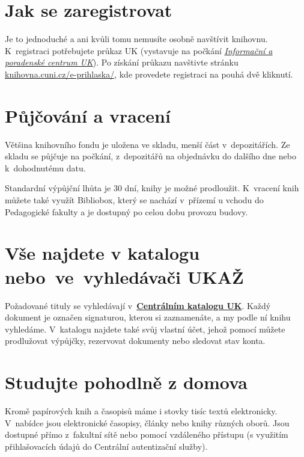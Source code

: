 

\newcommand\ikonka[1]{\bigskip\bgroup\Large #1\egroup\par}
\ikonka{\faPencil}
\section{Jak se zaregistrovat }

Je to jednoduché a ani kvůli tomu nemusíte osobně navštívit knihovnu.
K~registraci  potřebujete
  průkaz UK (vystavuje na počkání
  \href{http://www.cuni.cz/UK-3249.html}{\emph{Informační a poradenské
  centrum UK}}). Po získání průkazu navštivte stránku \url{knihovna.cuni.cz/e-prihlaska/},
  kde provedete registraci na pouhá dvě kliknutí.

\ikonka{\faBook}
\section{Půjčování a vracení}

Většina knihovního fondu je uložena ve skladu, menší část
v~depozitářích. Ze skladu se půjčuje na počkání, z~depozitářů na
objednávku do dalšího dne nebo k~dohodnutému datu.


Standardní výpůjční lhůta je 30 dní, knihy je možné prodloužit.
K~vracení knih můžete také využít Bibliobox, který se nachází v~přízemí
u vchodu do Pedagogické fakulty a je dostupný po celou dobu provozu
budovy.

\ikonka{\faSearch}
\section{Vše najdete v katalogu nebo~ve~vyhledávači UKAŽ}

Požadované tituly se vyhledávají v~\href{http://ckis.cuni.cz/}{\textbf{Centrálním katalogu UK}}. Každý
dokument je označen signaturou, kterou si zaznamenáte,
a my podle ní knihu vyhledáme. V~katalogu najdete také svůj vlastní
účet, jehož pomocí můžete prodlužovat výpůjčky, rezervovat dokumenty nebo
sledovat stav konta.

\ikonka{\faBed}
\section{Studujte pohodlně z domova}
Kromě papírových knih a časopisů máme i
stovky tisíc textů elektronicky.  V~nabídce jsou elektronické
časopisy, články nebo knihy různých oborů. Jsou dostupné přímo
z~fakultní sítě nebo pomocí vzdáleného přístupu (s využitím
přihlašovacích údajů do Centrální autentizační služby).

